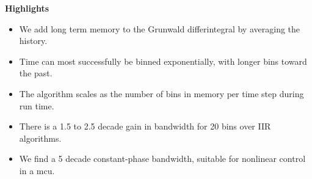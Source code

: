 \documentclass[12pt]{article}
\begin{document}
{\bf Highlights}
\begin{itemize}
\item We add long term memory to the Grunwald differintegral by averaging the history.
\item Time can most successfully be binned exponentially, with longer bins toward the past.
\item The algorithm scales as the number of bins in memory per time step during run time. 
\item There is a 1.5 to 2.5 decade gain in bandwidth for 20 bins over IIR algorithms. 
\item We find a 5 decade constant-phase bandwidth, suitable for nonlinear control in a mcu.    

\end{itemize}
\end{document}
